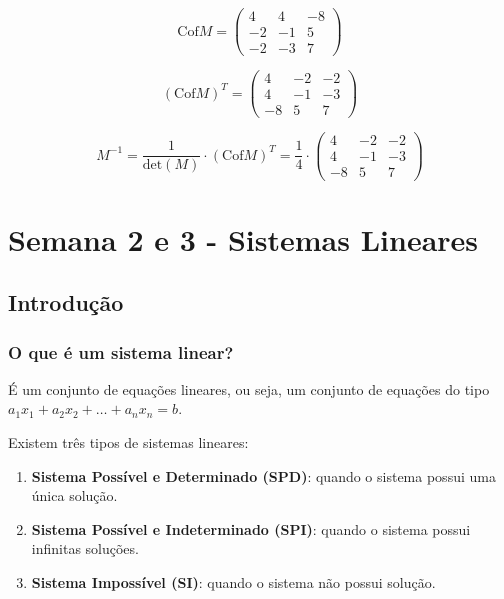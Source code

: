 \documentclass[12pt]{article}
\begin{document}
\[
\text{Cof}M = \begin{pmatrix}
    4  &  4  & -8 \\
   -2  & -1  &  5 \\
   -2  & -3  &  7
\end{pmatrix}
\]

\[
(\text{Cof}M)^T = \begin{pmatrix}
    4  & -2  & -2 \\
    4  & -1  & -3 \\
   -8  &  5  &  7
\end{pmatrix}
\]

\[
M^{-1} = \frac{1}{\text{det}(M)} \cdot \left(\text{Cof}M\right)^T = \frac{1}{4} \cdot \begin{pmatrix}
    4  & -2  & -2 \\
    4  & -1  & -3 \\
   -8  &  5  &  7
\end{pmatrix}
\]

\section{Semana 2 e 3 - Sistemas Lineares}
\subsection{Introdução}
\subsubsection{O que é um sistema linear?}
É um conjunto de equações lineares, ou seja, um conjunto de equações do tipo $a_1x_1 + a_2x_2 + \ldots + a_nx_n = b$.

Existem três tipos de sistemas lineares:
\begin{enumerate}
    \item \textbf{Sistema Possível e Determinado (SPD)}: quando o sistema possui uma única solução.
    \item \textbf{Sistema Possível e Indeterminado (SPI)}: quando o sistema possui infinitas soluções.
    \item \textbf{Sistema Impossível (SI)}: quando o sistema não possui solução.
\end{enumerate}
\end{document}
